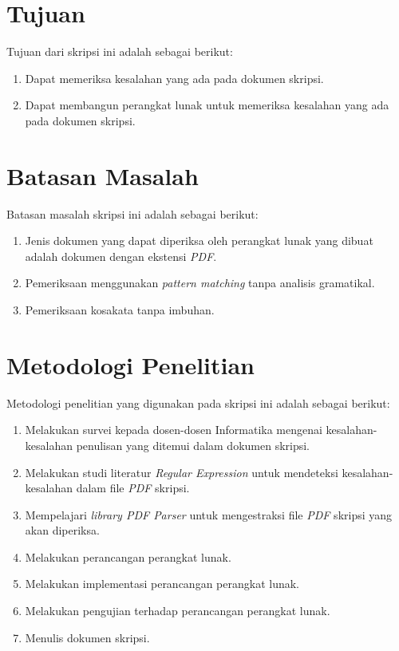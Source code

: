 \section{Tujuan}
\label{sec:tujuan}
Tujuan dari skripsi ini adalah sebagai berikut:
\begin{enumerate}
	\item Dapat memeriksa kesalahan yang ada pada dokumen skripsi.
	\item Dapat membangun perangkat lunak untuk memeriksa kesalahan yang ada pada dokumen skripsi.
\end{enumerate}

\section{Batasan Masalah}
\label{sec:batasan}
Batasan masalah skripsi ini adalah sebagai berikut:
\begin{enumerate}
	\item Jenis dokumen yang dapat diperiksa oleh perangkat lunak yang dibuat adalah dokumen dengan ekstensi \textit{PDF}.
	\item Pemeriksaan menggunakan \textit{pattern matching} tanpa analisis gramatikal.
	\item Pemeriksaan kosakata tanpa imbuhan.
\end{enumerate}

\section{Metodologi Penelitian}
\label{sec:metlit}
Metodologi penelitian yang digunakan pada skripsi ini adalah sebagai berikut:
\begin{enumerate}
	\item Melakukan survei kepada dosen-dosen Informatika mengenai kesalahan-kesalahan penulisan yang ditemui dalam dokumen skripsi.
	\item Melakukan studi literatur \textit{Regular Expression} untuk mendeteksi kesalahan-kesalahan dalam file \textit{PDF} skripsi.
	\item Mempelajari \textit{library PDF Parser} untuk mengestraksi file \textit{PDF} skripsi yang akan diperiksa.
	\item Melakukan perancangan perangkat lunak.
	\item Melakukan implementasi perancangan perangkat lunak.
	\item Melakukan pengujian terhadap perancangan perangkat lunak.
	\item Menulis dokumen skripsi.
\end{enumerate}

